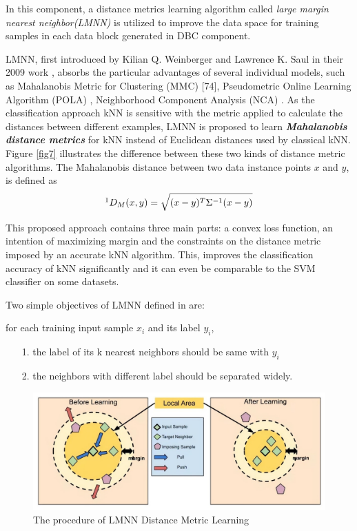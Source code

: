 In this component, a distance metrics learning algorithm called \textit{large margin nearest neighbor(LMNN)} \cite{69} is utilized to improve the data space for training samples in each data block generated in DBC component.

LMNN, first introduced by Kilian Q. Weinberger and Lawrence K. Saul in their 2009 work \cite{69}, absorbs the particular advantages of several individual models, such as Mahalanobis Metric for Clustering (MMC) [74], Pseudometric Online Learning Algorithm (POLA) \cite{65}, Neighborhood Component Analysis (NCA) \cite{71}. As the classification approach kNN is sensitive with the metric applied to calculate the distances between different examples, LMNN \cite{69} is proposed to learn \textbf{\textit{Mahalanobis distance metrics}} \cite{70} for kNN instead of Euclidean distances used by classical kNN. Figure \ref{fig7} illustrates the difference between these two kinds of distance metric algorithms. The Mahalanobis distance between two data instance points $x$ and $y$, is defined as
\begin{equation}\label{eq1}\footnotemark[1]
    D_{M}(x, y)=\sqrt{(x-y)^{T} \Sigma^{-1}(x-y)}
\end{equation}

This proposed approach contains three main parts: a convex loss function, an intention of maximizing margin and the constraints on the distance metric imposed by an accurate kNN algorithm. This, improves the classification accuracy of kNN significantly and it can even be comparable to the SVM classifier on some datasets.

Two simple objectives of LMNN defined in \cite{69} are:

for each training input sample $x_{i}$ and its label $y_{i}$,
\begin{enumerate}
    \item[1.] the label of its k nearest neighbors should be same with $y_i$
    \item[2.] the neighbors with different label should be separated widely. 
\end{enumerate}
\begin{figure}[h]
    \centering 
    \includegraphics[width=\textwidth]{images/fig8}
    \caption{The procedure of LMNN Distance Metric Learning}
    \label{fig8}
\end{figure}

